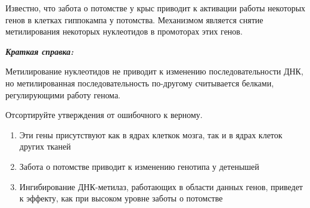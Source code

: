 
Известно, что забота о потомстве у крыс приводит к активации работы некоторых генов в клетках гиппокампа у потомства. Механизмом является снятие метилирования некоторых нуклеотидов в промоторах этих генов.

\textbf{\textit{Краткая справка:}}

Метилирование нуклеотидов не приводит к изменению последовательности ДНК, но метилированная последовательность по-другому считывается белками, регулирующими работу генома.

Отсортируйте утверждения от ошибочного к верному.

\begin{enumerate}
    \item Эти гены присутствуют как в ядрах клеткок мозга, так и в ядрах клеток других тканей
    \item Забота о потомстве приводит к изменению генотипа у детенышей
    \item Ингибирование ДНК-метилаз, работающих в области данных генов, приведет к эффекту, как при высоком уровне заботы о потомстве
\end{enumerate}

